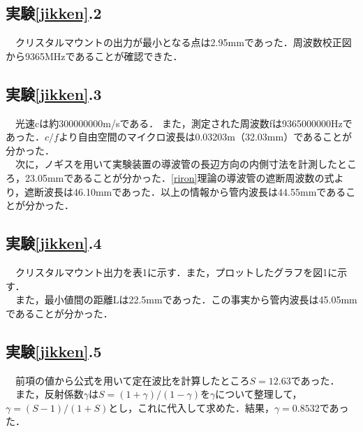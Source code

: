 \subsection{実験\ref{jikken}.2}
　クリスタルマウントの出力が最小となる点は2.95mmであった．周波数校正図から9365MHzであることが確認できた．

\subsection{実験\ref{jikken}.3}
　光速cは約300000000m/sである． また，測定された周波数fは9365000000Hzであった．$c/f$より自由空間のマイクロ波長は0.03203m（32.03mm）であることが分かった．\\
　次に，ノギスを用いて実験装置の導波管の長辺方向の内側寸法を計測したところ，23.05mmであることが分かった．\ref{riron}理論の導波管の遮断周波数の式より，遮断波長は46.10mmであった．以上の情報から管内波長は44.55mmであることが分かった．

\subsection{実験\ref{jikken}.4}
　クリスタルマウント出力を表1に示す．また，プロットしたグラフを図1に示す．\\
　また，最小値間の距離Lは22.5mmであった．この事実から管内波長は45.05mmであることが分かった．

\subsection{実験\ref{jikken}.5}
　前項の値から公式を用いて定在波比を計算したところ$S=12.63$であった．\\
　また，反射係数$\gamma$は$S=(1+\gamma)/(1-\gamma)$を$\gamma$について整理して，$\gamma=(S-1)/(1+S)$とし，これに代入して求めた．結果，$\gamma=0.8532$であった．

